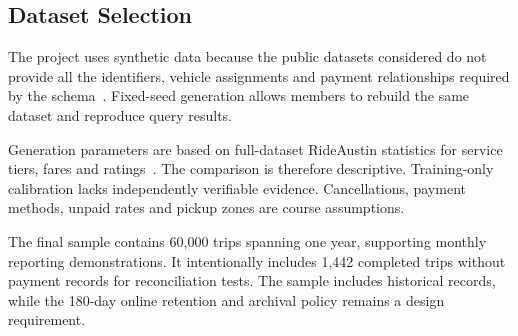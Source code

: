 \subsection{Dataset Selection}
\label{subsec:dataset}

The project uses synthetic data because the public datasets considered do not provide all the identifiers, vehicle assignments and payment relationships required by the schema~\cite{tlctripdata}. Fixed-seed generation allows members to rebuild the same dataset and reproduce query results.

Generation parameters are based on full-dataset RideAustin statistics for service tiers, fares and ratings~\cite{zuniga2020rideaustin}. The comparison is therefore descriptive. Training-only calibration lacks independently verifiable evidence. Cancellations, payment methods, unpaid rates and pickup zones are course assumptions.

The final sample contains 60{,}000 trips spanning one year, supporting monthly reporting demonstrations. It intentionally includes 1{,}442 completed trips without payment records for reconciliation tests. The sample includes historical records, while the 180-day online retention and archival policy remains a design requirement.
